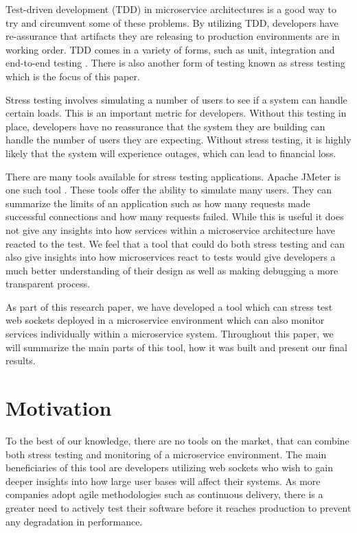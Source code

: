 Test-driven development (TDD) in microservice architectures is a good way to try and circumvent some of these problems. By utilizing TDD, developers have re-assurance that artifacts they are releasing to production environments are in working order. TDD comes in a variety of forms, such as unit, integration and end-to-end testing \cite{7160271}. There is also another form of testing known as stress testing which is the focus of this paper. 

Stress testing involves simulating a number of users to see if a system can handle certain loads. This is an important metric for developers. Without this testing in place, developers have no reassurance that the system they are building can handle the number of users they are expecting. Without stress testing, it is highly likely that the system will experience outages, which can lead to financial loss.

There are many tools available for stress testing applications. Apache JMeter is one such tool \cite{jmeter}. These tools offer the ability to simulate many users. They can summarize the limits of an application such as how many requests made successful connections and how many requests failed. While this is useful it does not give any insights into how services within a microservice architecture have reacted to the test. We feel that a tool that could do both stress testing and can also give insights into how microservices react to tests would give developers a much better understanding of their design as well as making debugging a more transparent process.

As part of this research paper, we have developed a tool which can stress test web sockets deployed in a microservice environment which can also monitor services individually within a microservice system. Throughout this paper, we will summarize the main parts of this tool, how it was built and present our final results.

\section{Motivation}

To the best of our knowledge, there are no tools on the market, that can combine both stress testing and monitoring of a microservice environment. The main beneficiaries of this tool are developers utilizing web sockets who wish to gain deeper insights into how large user bases will affect their systems. As more companies adopt agile methodologies such as continuous delivery, there is a greater need to actively test their software before it reaches production to prevent any degradation in performance.


